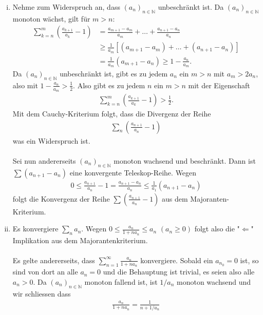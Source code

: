 \documentclass[a4paper, 20]{exam}
\begin{document}
\begin{solution} 
\begin{enumerate}[i)]
\item Nehme zum Widerspruch an, dass $(a_n)_{n \in \mathbb{N}}$ unbeschränkt ist. Da $(a_n)_{n \in \mathbb{N}}$ monoton wächst, gilt für $m >n$:
\begin{align*}
\sum_{k=n}^m \left( \frac{a_{k+1}}{a_k}-1 \right) & = \frac{a_{m+1}-a_m}{a_m} + \dots + \frac{a_{n+1}-a_n}{a_n} \\
& \geq \frac{1}{a_m}[ (a_{m+1}-a_m) + \dots + (a_{n+1}-a_n)] \\
& = \frac{1}{a_m}(a_{m+1}-a_n) \geq 1 - \frac{a_n}{a_m}.
\end{align*}
Da $(a_n)_{n \in \mathbb{N}}$ unbeschränkt ist, gibt es zu jedem $a_n$ ein $m>n$ mit $a_m > 2a_n$, also mit $1- \frac{a_n}{a_m}> \frac{1}{2}$. Also gibt es zu jedem $n$ ein $m>n$ mit der Eigenschaft
\begin{align*}
\sum_{k=n}^m \left( \frac{a_{k+1}}{a_k}-1 \right) > \frac{1}{2}.
\end{align*}
Mit dem Cauchy-Kriterium folgt, dass die Divergenz der Reihe 
\begin{align*}
\sum_n \left( \frac{a_{n+1}}{a_n}-1 \right)
\end{align*}
was ein Widerspruch ist. 
\\\\
Sei nun andererseits $(a_n)_{n \in \mathbb{N}}$ monoton wachsend und beschränkt. Dann ist $\sum (a_{n+1}-a_n)$ eine konvergente Teleskop-Reihe. Wegen
\begin{align*}
0 \leq \frac{a_{n+1}}{a_n}-1 = \frac{a_{n+1}-a_n}{a_n} \leq \frac{1}{a_1}(a_{n+1}-a_n)
\end{align*}
folgt die Konvergenz der Reihe $\sum \left( \frac{a_{n+1}}{a_n}-1 \right)$ aus dem Majoranten-Kriterium. 
\item Es konvergiere $\sum_n a_n $. Wegen $0 \leq \frac{a_n}{1+na_n} \leq a_n$ $(a_n \geq 0)$ folgt also die "$\Longleftarrow$" Implikation aus dem Majorantenkriterium. 
\\\\
Es gelte andererseits, dass $\sum_{n=1}^\infty \frac{a_n}{1+na_n}$ konvergiere. Sobald ein $a_{n_0}=0$ ist, so sind von dort an alle $a_n=0$ und die Behauptung ist trivial, es seien also alle $a_n >0$. Da $(a_n)_{n \in \mathbb{N}}$ monoton fallend ist, ist $1/a_n$ monoton wachsend und wir schliessen dass 
\begin{align*}
\frac{a_n}{1+na_n}= \frac{1}{n+ 1/a_n}
\end{align*}

\end{enumerate}
\end{solution}
\end{document}

